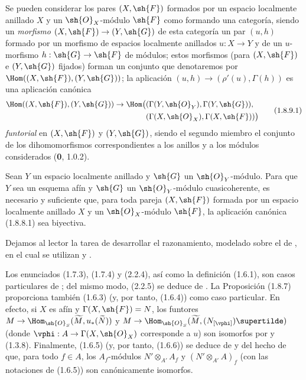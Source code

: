 \begin{env}[1.8.9]
\label{ega2:addendum:I.1.8.9-fr}
Se pueden considerar los pares $(X,\sh{F})$ formados por un espacio localmente anillado $X$ y un $\sh{O}_X$-módulo $\sh{F}$ como formando una categoría, siendo un \emph{morfismo} $(X,\sh{F})\to(Y,\sh{G})$ de esta categoría un par $(u,h)$ formado por un morfismo de
espacios localmente anillados $u:X\to Y$ y de un $u$-morfismo
$h:\sh{G}\to\sh{F}$ de módulos; estos
morfismos (para $(X,\sh{F})$ e $(Y,\sh{G})$ fijados) forman un conjunto
que denotaremos por $\Hom((X,\sh{F}),(Y,\sh{G}))$; la aplicación
$(u,h)\to(\rho'(u),\Gamma(h))$ es una aplicación canónica
\begin{equation}
\label{ega2:addendum:I.1.8.9.1-fr}
\begin{split}
  \Hom((X,\sh{F}),(Y,\sh{G}))\to
  \Hom\bigl(
    &(\Gamma(Y,\sh{O}_Y),\Gamma(Y,\sh{G})),\\
    &(\Gamma(X,\sh{O}_X),\Gamma(X,\sh{F}))
  \bigr)
\end{split}
\tag{1.8.9.1}
\end{equation}
\emph{funtorial} en $(X,\sh{F})$ y $(Y,\sh{G})$, siendo el segundo miembro
el conjunto de los dihomomorfismos correspondientes a los anillos y a
los módulos considerados (\textbf 0, 1.0.2).
\end{env}

\begin{corollary}[1.8.10]
\label{ega2:addendum:I.1.8.10-fr}
Sean $Y$ un espacio localmente anillado y $\sh{G}$ un
$\sh{O}_Y$-módulo. Para que $Y$ sea un esquema afín y $\sh{G}$ un
$\sh{O}_Y$-módulo cuasicoherente, es necesario y suficiente que, para
toda pareja $(X,\sh{F})$ formada por un espacio localmente anillado $X$
y un $\sh{O}_X$-módulo $\sh{F}$, la aplicación canónica \textup{(1.8.8.1)} sea
biyectiva.
\end{corollary}

Dejamos al lector la tarea de desarrollar el razonamiento, modelado
sobre el de , en el cual se utilizan  y
.

\begin{remark}[1.8.11]
\label{ega2:addendum:I.1.8.11-fr}
Los enunciados (1.7.3), (1.7.4) y (2.2.4), así como la
definición (1.6.1), son casos particulares de ; del
mismo modo, (2.2.5) se deduce de . La Proposición
(1.8.7) proporciona también (1.6.3) (y, por tanto, (1.6.4)) como
caso particular. En efecto, si $X$ es afín y $\Gamma(X,\sh{F})=N$, los
funtores
$M\to
  \Hom_{\sh{O}_S}(\widetilde M,u_*(\widetilde N))$ y $M\to
  \Hom_{\sh{O}_S}(\widetilde M,(N_{[\vphi]})\supertilde)$
(donde $\vphi:A\to\Gamma(X,\sh{O}_X)$ corresponde a $u$) son
isomorfos por  y (1.3.8). Finalmente, (1.6.5) (y,
por tanto, (1.6.6)) se deduce de  y del hecho de que,
para todo $f\in A$, los $A_f$-módulos
$N'\otimes_{A'}A_f$ y $(N'\otimes_{A'}A)_f$
(con las notaciones de (1.6.5)) son canónicamente isomorfos.
\end{remark}

